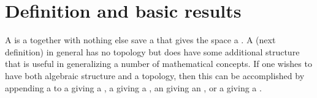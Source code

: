 \section{Definition and basic results}
A  is a  together with nothing else save a  
that gives the space a  .
A  (next definition) in general has no topology but does have some additional 
 structure that 
is useful in generalizing a number of mathematical concepts.
If one wishes to have both algebraic structure and a topology, then this can be accomplished by appending 
a  to a  giving a  , 
a  giving a ,
an  giving an  , %
or a  giving a  . %

